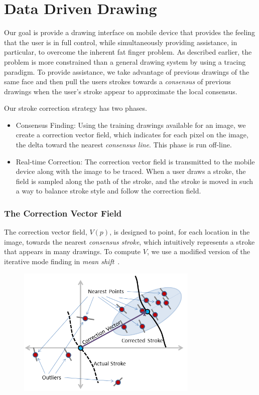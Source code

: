 \section{Data Driven Drawing}

Our goal is provide a drawing interface on mobile device that provides the feeling that the user is in full control, while simultaneously providing assistance, in particular, to overcome the inherent fat finger problem. As described earlier, the problem is more constrained than a general drawing system by using a tracing paradigm. To provide assistance, we take advantage of previous drawings of the same face and then pull the users strokes towards a {\em consensus} of previous drawings when the user's stroke appear to approximate the local consensus.

Our stroke correction strategy has two phases.
\begin{itemize}
\item Consensus Finding: Using the training drawings available for an image, we create a correction vector field, which indicates for each pixel on the image, the delta toward the nearest {\em consensus line}.  This phase is run off-line.
\item Real-time Correction: The correction vector field is transmitted to the mobile device along with the image to be traced.  When a user draws a stroke, the field is sampled along the path of the stroke, and the stroke is moved in such a way to balance stroke style and follow the correction field.
\end{itemize}

\subsubsection{The Correction Vector Field}

The correction vector field, $V(p)$, is designed to point, for each location in the image, towards the nearest {\em consensus stroke}, which intuitively represents a stroke that appears in many drawings. To compute $V$, we use a modified version of the iterative mode finding in {\em mean shift}~\cite{10.1109/ICCV.1999.790416}.


\begin{figure}
  \centering%
  \includegraphics[width=3.4in]{ellipse.png}
  \caption{  }
  \label{fig:ellipse}
\end{figure}

